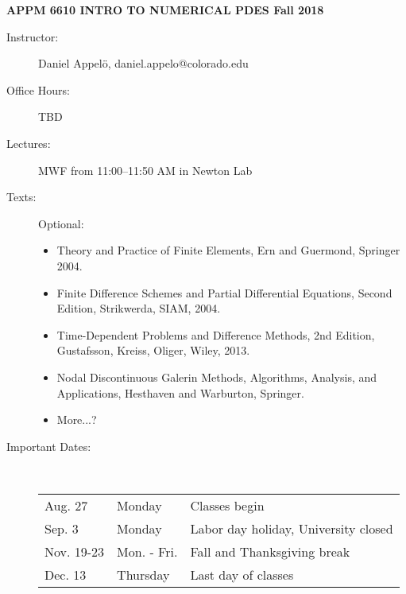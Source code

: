 \documentclass[10pt]{article}
\begin{document}
\baselineskip=12pt
\pagestyle{empty}
\newcommand{\ds}{\displaystyle}
\newcommand{\be}{\begin{enumerate}}
\newcommand{\ee}{\end{enumerate}}


\centerline{\bf APPM 6610 \hfill INTRO TO NUMERICAL PDES
                          \hfill Fall 2018}
\bigskip

\begin{description}
\item[Instructor:] Daniel Appel\"{o}, daniel.appelo@colorado.edu
\item[Office Hours:] TBD \\
                   

\item[Lectures:] MWF from 11:00--11:50 AM in Newton Lab

\item[Texts:] Optional: 
\begin{itemize}
\item Theory and Practice of Finite Elements, Ern and Guermond, Springer 2004. 
\item Finite Difference Schemes and Partial Differential Equations, Second Edition, Strikwerda, SIAM, 2004.
\item Time-Dependent Problems and Difference Methods, 2nd Edition, Gustafsson, Kreiss, Oliger, Wiley, 2013.
\item Nodal Discontinuous Galerin Methods, Algorithms, Analysis, and Applications, Hesthaven and Warburton, Springer.
\item More...? 
\end{itemize}
\item[Important Dates:] ~~ \\
     \begin{tabular}{l l l}
     Aug.  27  &  Monday    & Classes begin \\
     Sep.  3  &  Monday  & Labor day holiday, University closed \\
     Nov. 19-23  &  Mon. - Fri. & Fall and Thanksgiving break\\
     Dec. 13  &  Thursday & Last day of classes \\
     \end{tabular}


\end{description}
\end{document}
